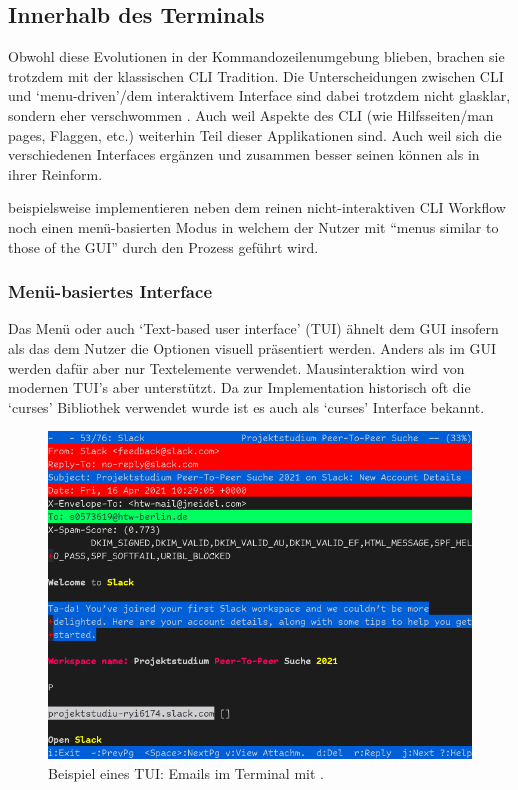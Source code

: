 \documentclass[oneside,bibliography=totocnumbered,BCOR=5mm]{scrbook}
\begin{document}
\subsection{Innerhalb des Terminals}

Obwohl diese Evolutionen in der Kommandozeilenumgebung blieben, brachen sie
trotzdem mit der klassischen CLI Tradition. Die Unterscheidungen zwischen CLI
und `menu-driven'/dem interaktivem Interface sind dabei trotzdem nicht glasklar,
sondern eher verschwommen \parencite{Paap_1988}. Auch weil Aspekte des CLI (wie
Hilfsseiten/man pages, Flaggen, etc.) weiterhin Teil dieser Applikationen sind.
Auch weil sich die verschiedenen Interfaces ergänzen und zusammen besser seinen
können als in ihrer Reinform.

\smallskip

\textcite{bland2007design} beispielsweise implementieren neben dem reinen
nicht-interaktiven CLI Workflow noch einen menü-basierten Modus in welchem der
Nutzer mit ``menus similar to those of the GUI'' durch den Prozess geführt wird.

\subsubsection{Menü-basiertes Interface}
\label{sec:def-menu}

Das Menü oder auch `Text-based user interface' (TUI) ähnelt dem GUI insofern als
das dem Nutzer die Optionen visuell präsentiert werden. Anders als im GUI werden
dafür aber nur Textelemente verwendet. Mausinteraktion wird von modernen TUI's
aber unterstützt. Da zur Implementation historisch oft die `curses' Bibliothek
verwendet wurde ist es auch als `curses' Interface bekannt.

\medskip

\begin{figure}[H]
  \centering
  \includegraphics[scale=.47]{menu-example.png}
  \caption{Beispiel eines TUI: Emails im Terminal mit .}
  \label{fig:menu-example}
\end{figure}
\end{document}
